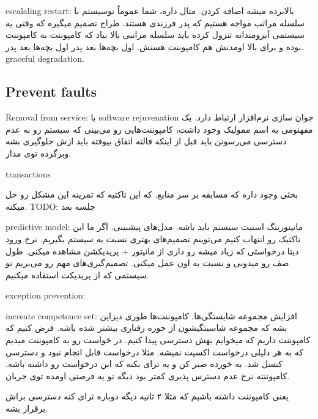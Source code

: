 escalaling restart: بالابرده میشه اضافه کردن. مثال داره، شما عموماً توسیستم با
سلسله مراتب مواجه هستیم که پدر فرزندی هستند. طراح تصمیم میگیره که وقتی یه سیستمی
آبرومندانه تنزول کرده باید سلسله مراتبی بالا بیاد که کامپوننت به کامپوننت بوده و
برای بالا اومدنش هم کامپوننت هستش. اول بچه‌ها بعد پدر اول بچه‌ها بعد پدر.
graceful degradation.

\subsection{Prevent faults}

Removal from service: با software rejuvenation جوان سازی نرم‌افزار ارتباط دارد.
یک مفهنومی به اسم ممولیک وجود داشت، کامپوننت‌هایی رو می‌بینی که سیستم رو به عدم
دسترسی می‌رسونن باید قبل از اینکه فالته اتفاق بیوفته باید ازش جلوگیری بشه
وبرگرده توی مدار.

transactions

بحثی وجود داره که مسابقه بر سر منابع. که این تاکتیه که تمرینه این مشکل رو حل
میکنه.
TODO: جلسه بعد

predictive model: مانیتورینگ استیت سیستم باید باشه. مدل‌های پیشبینی. اگر ما این
تاکتیک رو انتهاب کنیم می‌توینم تصمیم‌های بهتری نسبت به سیستم بگیریم. نرخ ورود
دیتا درخواستی که زیاد میشه رو داری از مانیتور + پریدیکشن مشاهده میکنی. طول صف رو
میدونی و نسبت به اون عمل میکنی. تصمیم‌گیری‌های مهم رو می‌بریم تو سیستمی که از
پریدیکت استفاده میکنیم.

exception prevention:

increate competence set: افزایش مجموعه شایستگی‌ها. کامپوننت‌ها طوری دیزاین بشه
که مجموعه شاسیتگیشون از حوزه رفتاری بیشتر شده باشه. فرض کنیم که کامپوننت داریم
که میخوایم بهش دسترسی پیدا کنیم. در خواست رو به کامپوننت میدیم که به هر دلیلی
درخواست اکسپت نمیشه. مثلا درخواست قابل انجام نبود و دسترسی کنسل شد. یه خورده صبر
کن و یه ترای بکنه که این درخواست رو داشته باشه. کامپوننته نرخ عدم دسترس پذیری
کمتر بود دیگه تو یه فرصتی اومده توی جریان.

یعنی کامپوننت داشته باشیم که مثلا ۲ ثانیه دیگه دوباره ترای کنه دسترسی براش
برقرار بشه.